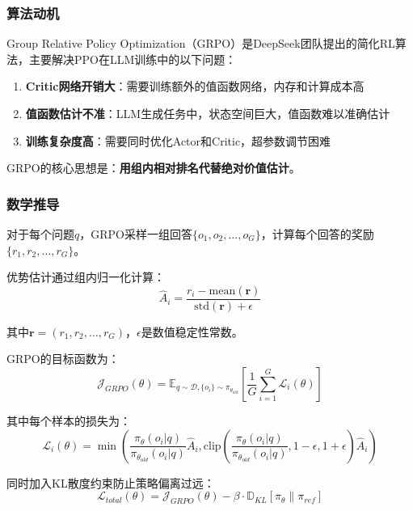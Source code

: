 \documentclass[12pt,a4paper]{article}
\begin{document}
\subsubsection{算法动机}

Group Relative Policy Optimization（GRPO）是DeepSeek团队提出的简化RL算法，主要解决PPO在LLM训练中的以下问题：

\begin{enumerate}
    \item \textbf{Critic网络开销大}：需要训练额外的值函数网络，内存和计算成本高
    \item \textbf{值函数估计不准}：LLM生成任务中，状态空间巨大，值函数难以准确估计
    \item \textbf{训练复杂度高}：需要同时优化Actor和Critic，超参数调节困难
\end{enumerate}

GRPO的核心思想是：\textbf{用组内相对排名代替绝对价值估计}。

\subsubsection{数学推导}

对于每个问题$q$，GRPO采样一组回答$\{o_1, o_2, \ldots, o_G\}$，计算每个回答的奖励$\{r_1, r_2, \ldots, r_G\}$。

优势估计通过组内归一化计算：
\begin{equation}
\hat{A}_i = \frac{r_i - \text{mean}(\mathbf{r})}{\text{std}(\mathbf{r}) + \epsilon}
\end{equation}

其中$\mathbf{r} = (r_1, r_2, \ldots, r_G)$，$\epsilon$是数值稳定性常数。

GRPO的目标函数为：
\begin{equation}
\mathcal{J}_{GRPO}(\theta) = \mathbb{E}_{q \sim \mathcal{D}, \{o_i\} \sim \pi_{\theta_{old}}}\left[\frac{1}{G}\sum_{i=1}^{G} \mathcal{L}_i(\theta)\right]
\end{equation}

其中每个样本的损失为：
\begin{equation}
\mathcal{L}_i(\theta) = \min\left(\frac{\pi_\theta(o_i|q)}{\pi_{\theta_{old}}(o_i|q)}\hat{A}_i, \text{clip}\left(\frac{\pi_\theta(o_i|q)}{\pi_{\theta_{old}}(o_i|q)}, 1-\epsilon, 1+\epsilon\right)\hat{A}_i\right)
\end{equation}

同时加入KL散度约束防止策略偏离过远：
\begin{equation}
\mathcal{L}_{total}(\theta) = \mathcal{J}_{GRPO}(\theta) - \beta \cdot \mathbb{D}_{KL}[\pi_\theta \| \pi_{ref}]
\end{equation}
\end{document}
